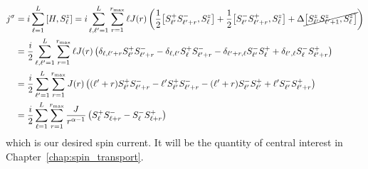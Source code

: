 \begin{align}
    j^{\sigma} & = i \sum_{\ell=1}^L \comm{H}{\Sz_{\ell}} = i \sum_{\ell,\ell^{\prime}=1}^L \sum_{r=1}^{r_{\mathrm{max}}}
    \ell J(r) \left(\frac{1}{2}\comm{\Sp_{\ell^{\prime}}\Sm_{\ell^{\prime}+r}}{\Sz_{\ell}}
    + \frac{1}{2}\comm{\Sm_{\ell^{\prime}}\Sp_{\ell^{\prime}+r}}{\Sz_{\ell}}
    + \Delta \cancel{\comm{\Sz_{\ell^{\prime}}\Sz_{\ell^{\prime}+1}}{\Sz_{\ell}}} \right) \nonumber                       \\
               & = \frac{i}{2}  \sum_{\ell,\ell^{\prime}=1}^L \sum_{r=1}^{r_{\mathrm{max}}}\ell J(r)  \left(
    \delta_{\ell,\ell^{\prime}+r}\Sp_{\ell^{\prime}} \Sm_{\ell^{\prime}+r}  - \delta_{\ell,\ell^{\prime}}
    \Sp_{\ell}\Sm_{\ell^{\prime}+r} - \delta_{\ell^{\prime} + r, \ell} \Sm_{\ell^{\prime}} \Sp_{\ell} +
    \delta_{\ell^{\prime},\ell}\Sm_{\ell}\Sp_{\ell^{\prime}+r}
    \right) \nonumber                                                                                                     \\
               & = \frac{i}{2}  \sum_{\ell^{\prime}=1}^L \sum_{r=1}^{r_{\mathrm{max}}} J(r)  \left(
    (\ell^{\prime}+r)\Sp_{\ell^{\prime}} \Sm_{\ell^{\prime}+r}  - \ell^{\prime}
    \Sp_{\ell^{\prime}}\Sm_{\ell^{\prime}+r} - (\ell^{\prime}+r) \Sm_{\ell^{\prime}} \Sp_{\ell^{\prime}} +
    \ell^{\prime}\Sm_{\ell^{\prime}}\Sp_{\ell^{\prime}+r}
    \right) \nonumber                                                                                                     \\
               & = \frac{i}{2} \sum_{\ell=1}^L \sum_{r=1}^{r_{\mathrm{max}}} \frac{J}{r^{\alpha-1}}
    \left(\Sp_{\ell}\Sm_{\ell+r}-\Sm_{\ell}\Sp_{\ell+r}\right)
    \label{eq:spin_current}
\end{align}
which is our desired spin current. It will be the quantity of central interest in Chapter~\ref{chap:spin_transport}.

